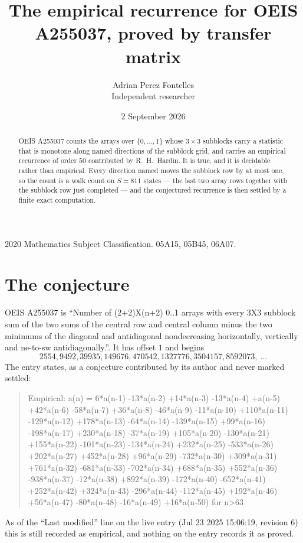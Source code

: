\documentclass[11pt,a4paper]{article}
\title{The empirical recurrence for OEIS A255037, proved by transfer matrix}
\author{Adrian Perez Fontelles\\ \small Independent researcher}
\date{2 September 2026}
\theoremstyle{plain}
\theoremstyle{definition}
\begin{document}
\maketitle

\begin{abstract}
OEIS A255037 counts the arrays over $\{0,\dots,1\}$ whose $3\times3$ subblocks carry a
statistic that is monotone along named directions of the subblock grid, and carries an
empirical recurrence of order $50$ contributed by R.~H.~Hardin. It is true, and it is
decidable rather than empirical. Every direction named moves the subblock row by at most one,
so the count is a walk count on $S=811$ states --- the last two array rows together with the
subblock row just completed --- and the conjectured recurrence is then settled by a finite
exact computation.
\end{abstract}

\noindent\small 2020 Mathematics Subject Classification. 05A15, 05B45, 06A07.\normalsize

\section{The conjecture}

OEIS A255037 is ``Number of (2+2)X(n+2) 0..1 arrays with every 3X3 subblock sum of the two sums of the central row and central column minus the two minimums of the diagonal and antidiagonal nondecreasing horizontally, vertically and ne-to-sw antidiagonally.''. It has offset $1$ and begins
\[
2554, 9492, 39935, 149676, 470542, 1327776, 3504157, 8592073,\ \dots
\]
The entry states, as a conjecture contributed by its author and never marked settled:
\begin{quote}
Empirical: a(n) = 6*a(n-1) -13*a(n-2) +14*a(n-3) -13*a(n-4) +a(n-5) +42*a(n-6) -58*a(n-7) +36*a(n-8) -46*a(n-9) -11*a(n-10) +110*a(n-11) -129*a(n-12) +178*a(n-13) -64*a(n-14) -139*a(n-15) +99*a(n-16) -198*a(n-17) +230*a(n-18) -37*a(n-19) +105*a(n-20) -130*a(n-21) +155*a(n-22) -101*a(n-23) -134*a(n-24) +232*a(n-25) -533*a(n-26) +202*a(n-27) +452*a(n-28) +96*a(n-29) -732*a(n-30) +309*a(n-31) +761*a(n-32) -681*a(n-33) -702*a(n-34) +688*a(n-35) +552*a(n-36) -938*a(n-37) -12*a(n-38) +892*a(n-39) -172*a(n-40) -652*a(n-41) +252*a(n-42) +324*a(n-43) -296*a(n-44) -112*a(n-45) +192*a(n-46) +56*a(n-47) -80*a(n-48) -16*a(n-49) +16*a(n-50) for n>63
\end{quote}
As of the ``Last modified'' line on the live entry (Jul 23 2025 15:06:19, revision 6) this is still
recorded as empirical, and nothing on the entry records it as proved.
\end{document}

